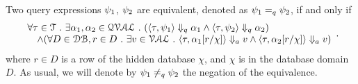 %
\begin{defn}
%
\label{def:query_equal}
Two query expressions $\psi_1$, $\psi_2$ are equivalent, denoted as $\psi_1 =_{q} \psi_2$, if and only if
$$
 \begin{array}{l} 
   \forall \mathtt{\tau} \in \mathcal{T} ~.~ \exists \alpha_1, \alpha_2 \in \mathcal{QVAL} ~.~
    (\langle \mathtt{\tau},  \psi_1 \rangle \Downarrow_q \alpha_1 \land \langle \mathtt{\tau},  \psi_2  \rangle \Downarrow_q \alpha_2) 
    \\
    \quad \land (\forall D \in \mathcal{DB}, r \in D ~.~ 
    \exists v \in \mathcal{VAL} ~.~ 
          \langle \mathtt{\tau}, \alpha_1[r/\chi] \rangle \Downarrow_a v \land \langle \mathtt{\tau},  \alpha_2[r/\chi]  \rangle \Downarrow_a v)  
  \end{array}.
$$
 where $r \in D$ is a row of the hidden database $\chi$, and $\chi$ is in the database domain $D$. 
 As usual, we will denote by $\psi_1 \neq_{q} \psi_2$  the negation of the equivalence.
%
\end{defn}
